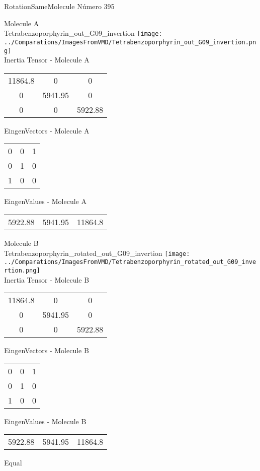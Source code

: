 \vtab[-2cm]
\begin{center}
{\large RotationSameMolecule \tab Número 395}
\end{center}
\begin{multicols}{2}
\begin{center}

Molecule A \\ 
Tetrabenzoporphyrin\_out\_G09\_invertion
\texttt{[image: ../Comparations/ImagesFromVMD/Tetrabenzoporphyrin\_out\_G09\_invertion.png]}
\\
Inertia Tensor - Molecule A \\
\vtab

\begin{tabular}{|c c c|}
11864.8	 & 	0	 & 	0	 \\
0	 & 	5941.95	 & 	0	 \\
0	 & 	0	 & 	5922.88
\end{tabular}

\vtab
 EingenVectors - Molecule A     \\
\vtab
\begin{tabular}{|c c c|}
0	 & 	0	 & 	1	 \\
0	 & 	1	 & 	0	 \\
1	 & 	0	 & 	0
\end{tabular}

\vtab
 EingenValues - Molecule A     \\
\vtab
\begin{tabular}{|c c c|}
5922.88	 & 	5941.95	 & 	11864.8	 \\
\end{tabular}
\columnbreak

Molecule B \\ 
Tetrabenzoporphyrin\_rotated\_out\_G09\_invertion
\texttt{[image: ../Comparations/ImagesFromVMD/Tetrabenzoporphyrin\_rotated\_out\_G09\_invertion.png]}
\\
Inertia Tensor - Molecule B \\
\vtab

\begin{tabular}{|c c c|}
11864.8	 & 	0	 & 	0	 \\
0	 & 	5941.95	 & 	0	 \\
0	 & 	0	 & 	5922.88
\end{tabular}

\vtab
 EingenVectors - Molecule B     \\
\vtab
\begin{tabular}{|c c c|}
0	 & 	0	 & 	1	 \\
0	 & 	1	 & 	0	 \\
1	 & 	0	 & 	0
\end{tabular}

\vtab
 EingenValues - Molecule B     \\
\vtab
\begin{tabular}{|c c c|}
5922.88	 & 	5941.95	 & 	11864.8	 \\
\end{tabular}

\end{center}
\end{multicols}
\begin{center}
\vtab
\vtab
\textcolor{NavyBlue}{\Large Equal}
\end{center}


